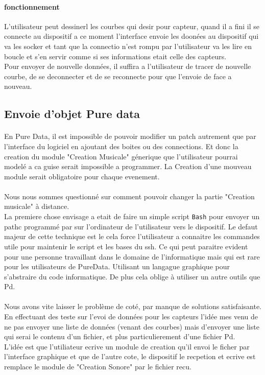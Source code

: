 \documentclass[a4paper, titlepage, oneside, 12pt]{article}%
\begin{document}
\paragraph{fonctionnement}
L'utilisateur peut dessinerl les courbes qui desir pour capteur, quand il a fini il se connecte au dispositif a ce moment l'interface envoie les doonées au dispositif qui va les socker et tant que la connectio n'est rompu par l'utilisateur va les lire en boucle et s'en servir comme si ses informations etait celle des capteurs.\\
Pour envoyer de nouvelle données, il suffira a l'utilisateur de tracer de nouvelle courbe, de se deconnecter et de se reconnecte pour que l'envoie de face a nouveau.

\subsection{Envoie d'objet Pure data}
\paragraph{}
En Pure Data, il est impossible de pouvoir modifier un patch autrement que par l'interface du logiciel en ajoutant des boites ou des connections. Et donc la creation du module "Creation Musicale" génerique que l'utilisateur pourrai modelé a ca guise serait impossible a programmer. La Creation d'une mouveau module serait obligatoire pour chaque evenement.
\paragraph{}
Nous nous sommes questionné sur comment  pouvoir changer la partie "Creation musicale" à distance.\\
La premiere chose envisage a etait de faire un simple script \texttt{Bash} pour envoyer un pathc programmé par sur l'ordinateur de l'utilisateur vers le dispositif. Le defaut majeur de cette technique est le cela force l'utilisateur a connaitre les commandes utile pour maintenir le script et les bases du ssh. Ce qui peut paraitre evident pour une personne travaillant dans le domaine de l'informatique mais qui est rare pour les utilisateurs de PureData. Utilisant un langague graphique pour s'abstraire du code informatique. De plus cela  oblige à utiliser un autre outils que Pd.

\paragraph{}
Nous avons vite laisser le problème de coté, par manque de solutions satisfaisante.\\
En effectuant des teste sur l'evoi de données pour les capteurs l'idée mes venu de ne pas envoyer une liste de données (venant des courbes) mais d'envoyer une liste qui serai le contenu d'un fichier, et plus particulierement d'une fichier Pd.\\
L'idée est que l'utiliateur ecrive un module de creation qu'il envoi le ficher par l'interface graphique et que de l'autre cote, le dispositif le recpetion et ecrive est remplace le module de "Creation Sonore" par le fichier recu.
\end{document}
